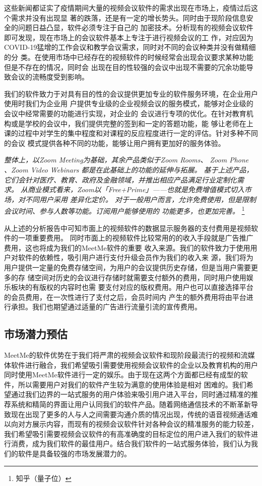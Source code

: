 \documentclass[a4paper,12pt]{article}
\begin{document}
    这些新闻都证实了疫情期间大量的视频会议软件的需求出现在市场上，疫情过后这个需求并没有出现显
    著的跌落，还是有一定的增长势头。同时由于现阶段信息安全的问题日益凸显，软件必须专注于自己的
    加密技术。分析现有的视频会议软件即可发现，现在市场上的会议软件基本上专注于进行视频会议的工
    作，对应因为COVID-19猛增的工作会议和教学会议需求，同时对不同的会议种类并没有做精细的分
    类。在使用市场中已经存在的视频软件的时候经常会出现会议要求某种功能但是不存在的情况，同时会
    出现在目的性较强的会议中出现不需要的冗余功能导致会议的流畅度受到影响。

    我们的软件致力于对具有目的性的会议提供更加专业的软件服务环境，在企业用户使用时我们为企业用
    户提供专业级的企业视频会议的服务模式，能够对企业级的会议中经常需要的功能进行实现，对企业的
    会议进行专项的优化。在针对教育机构或是学校的会议中，我们提供完整的签到和一定的答题功能，能
    够让老师在上课的过程中对学生的集中程度和对课程的反应程度进行一定的评估。针对多种不同的会议
    模式提供各种不同的功能，能够让用户拥有更加好的服务体验。

    \textit{整体上，以Zoom Meeting为基础，其余产品类似于Zoom Rooms、 Zoom Phone 、Zoom
    Video Webinars 都是在此基础上的功能的延伸与拓展。
    基于上述产品，它们会针对医疗、教育、政府及金融领域，并推出相应产品满足行业定制化需
    求。
    从商业模式看来，Zoom以「Free+Prime」——也就是免费增值模式切入市场，对不同用户采用
    差异化定价。
    对于一般用户而言，允许免费使用，但是限制会议时间、参与人数等功能。订阅用户能够使用的
    功能更多，也更加完善。}
    \footnote{知乎（量子位）}

    从上述的分析报告中可知市面上的视频软件的数据显示服务器的支付费用是视频软件的一项重要费用。
    同时市面上的视频软件比较常用的的收入手段就是广告推广费用，这也将成为我们的MeetMe软件的重要
    收入来源。我们的软件致力于使用用户对软件的依赖性，吸引用户进行支付升级会员作为我们的收入来
    源，我们将为用户提供一定量的免费存储空间，为用户的会议提供历史存储，但是当用户需要更多的存
    储空间对历史的会议进行存储时就需要支付额外的费用，同时用户使用娱乐板块的有版权的内容时也需
    要支付对应的版权费用。用户也可以直接选择平台的会员费用，在一次性进行了支付之后，会员时间内
    产生的额外费用将由平台进行承担。我们也期望通过适量的广告进行流量引流的宣传费用。
    
    \subsection{市场潜力预估}
    MeetMe的软件优势在于我们将严肃的视频会议软件和现阶段最流行的视频和流媒体软件进行融合，我们希望吸引需要使用视频会议软件的企业以及教育机构的用户同时使用MeetMe软件进行一定的娱乐。由于现在这两个方面都已经有成型的软件，所以需要用户对我们的软件产生较为满意的使用体验是相对
    困难的。我们希望通过我们边界的一站式服务的用户体验来吸引用户进入平台，同时通过精准的推荐系统和精简的界面让用户认同我们的软件产品。随着网络通信技术的不断革新导致现在出现了更多的人与人之间需要沟通介质的情况出现，传统的语音视频通话难以向对方展示内容，而现有的视频会议软件针对各种会议的精准服务的能力较差，我们希望吸引需要视频会议软件的有高准确度的目标定位的用户进入我们的软件进行消费，成为我们软件的最佳用户。结合我们软件的一站式服务体验，我们认为我们的软件是具备较强的市场发展潜力的。
    
\end{document}
